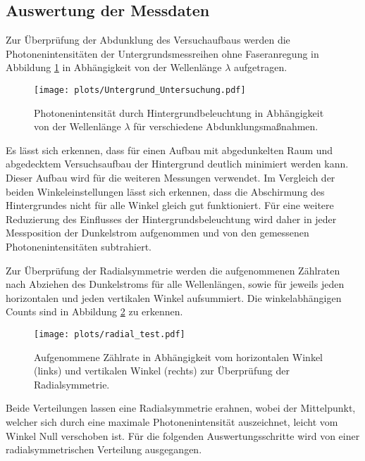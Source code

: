 \subsection{Auswertung der Messdaten}
Zur Überprüfung der Abdunklung des Versuchaufbaus werden die Photonenintensitäten der Untergrundsmessreihen ohne Faseranregung in Abbildung \ref{fig:Untergrund_Untersuchung} in Abhängigkeit von der Wellenlänge $\lambda$ aufgetragen.
\begin{figure}
    \centering
    \texttt{[image: plots/Untergrund\_Untersuchung.pdf]}
    \caption{Photonenintensität durch Hintergrundbeleuchtung in Abhängigkeit von der Wellenlänge $\lambda$ für verschiedene Abdunklungsmaßnahmen.}
    \label{fig:Untergrund_Untersuchung}
\end{figure}
\FloatBarrier
Es lässt sich erkennen, dass für einen Aufbau mit abgedunkelten Raum und abgedecktem Versuchsaufbau der Hintergrund deutlich minimiert werden kann. Dieser Aufbau wird für die weiteren Messungen verwendet. 
Im Vergleich der beiden Winkeleinstellungen lässt sich erkennen, dass die Abschirmung des Hintergrundes nicht für alle Winkel gleich gut funktioniert. 
Für eine weitere Reduzierung des Einflusses der Hintergrundsbeleuchtung wird daher in jeder Messposition der Dunkelstrom aufgenommen und von den gemessenen Photonenintensitäten subtrahiert.

Zur Überprüfung der Radialsymmetrie werden die aufgenommenen Zählraten nach Abziehen des Dunkelstroms für alle Wellenlängen, sowie für jeweils jeden horizontalen und jeden vertikalen Winkel aufsummiert. Die winkelabhängigen Counts sind in Abbildung \ref{fig:radial_test} zu erkennen. 
\begin{figure}
    \centering
    \texttt{[image: plots/radial\_test.pdf]}
    \caption{Aufgenommene Zählrate in Abhängigkeit vom horizontalen Winkel (links) und vertikalen Winkel (rechts) zur Überprüfung der Radialsymmetrie.}
    \label{fig:radial_test}
\end{figure}
\FloatBarrier
Beide Verteilungen lassen eine Radialsymmetrie erahnen, wobei der Mittelpunkt, welcher sich durch eine maximale Photonenintensität auszeichnet, leicht vom Winkel Null verschoben ist. Für die folgenden Auswertungsschritte wird von einer radialsymmetrischen Verteilung ausgegangen.

